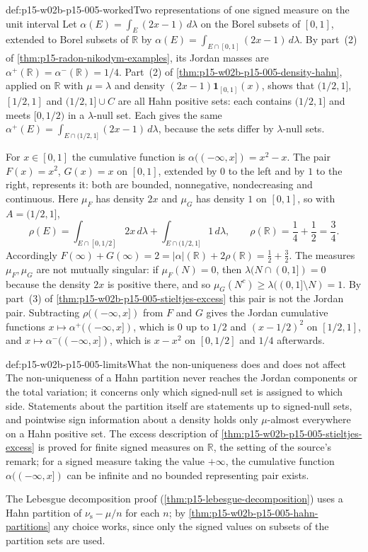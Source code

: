 \begin{hbexample}{def:p15-w02b-p15-005-worked}{Two representations of one signed measure on the unit interval}
Let \(\alpha(E)=\int_E(2x-1)\,d\lambda\) on the Borel subsets of
\([0,1]\), extended to Borel subsets of \(\mathbb R\) by
\(\alpha(E)=\int_{E\cap[0,1]}(2x-1)\,d\lambda\). By
part~(2) of \cref{thm:p15-radon-nikodym-examples}, its Jordan masses
are \(\alpha^+(\mathbb R)=\alpha^-(\mathbb R)=1/4\). Part~(2) of
\cref{thm:p15-w02b-p15-005-density-hahn}, applied on \(\mathbb R\) with
\(\mu=\lambda\) and density \((2x-1)\mathbf1_{[0,1]}(x)\), shows that
\((1/2,1]\), \([1/2,1]\) and \((1/2,1]\cup C\) are all Hahn positive
sets: each contains \((1/2,1]\) and meets \([0,1/2)\) in a
\(\lambda\)-null set. Each gives the same
\(\alpha^+(E)=\int_{E\cap(1/2,1]}(2x-1)\,d\lambda\), because the sets
differ by \(\lambda\)-null sets.

For \(x\in[0,1]\) the cumulative function is
\(\alpha((-\infty,x])=x^2-x\). The pair \(F(x)=x^2\), \(G(x)=x\) on
\([0,1]\), extended by \(0\) to the left and by \(1\) to the right,
represents it: both are bounded, nonnegative, nondecreasing and
continuous. Here \(\mu_F\) has density \(2x\) and \(\mu_G\) has density
\(1\) on \([0,1]\), so with \(A=(1/2,1]\),
\[
 \rho(E)=\int_{E\cap[0,1/2]}2x\,d\lambda+\int_{E\cap(1/2,1]}1\,d\lambda,
 \qquad \rho(\mathbb R)=\frac14+\frac12=\frac34 .
\]
Accordingly \(F(\infty)+G(\infty)=2=\lvert\alpha\rvert(\mathbb R)+2\rho(\mathbb R)
=\tfrac12+\tfrac32\). The measures \(\mu_F,\mu_G\) are not mutually
singular: if \(\mu_F(N)=0\), then \(\lambda(N\cap(0,1])=0\) because the
density \(2x\) is positive there, and so
\(\mu_G(N^c)\geq\lambda((0,1]\setminus N)=1\). By part~(3) of \cref{thm:p15-w02b-p15-005-stieltjes-excess}
this pair is not the Jordan pair. Subtracting
\(\rho((-\infty,x])\) from \(F\) and \(G\) gives the Jordan cumulative
functions \(x\mapsto\alpha^+((-\infty,x])\), which is \(0\) up to
\(1/2\) and \((x-1/2)^2\) on \([1/2,1]\), and
\(x\mapsto\alpha^-((-\infty,x])\), which is \(x-x^2\) on \([0,1/2]\) and
\(1/4\) afterwards.
\end{hbexample}

\begin{hbwarning}{def:p15-w02b-p15-005-limits}{What the non-uniqueness does and does not affect}
The non-uniqueness of a Hahn partition never reaches the Jordan
components or the total variation; it concerns only which signed-null
set is assigned to which side. Statements about the partition itself
are statements up to signed-null sets, and pointwise sign information
about a density holds only \(\mu\)-almost everywhere on a Hahn positive
set. The excess description of
\cref{thm:p15-w02b-p15-005-stieltjes-excess} is proved for finite signed
measures on \(\mathbb R\), the setting of the source's remark; for a
signed measure taking the value \(+\infty\), the cumulative function
\(\alpha((-\infty,x])\) can be infinite and no bounded representing
pair exists.
\end{hbwarning}

The Lebesgue decomposition proof (\cref{thm:p15-lebesgue-decomposition})
uses a Hahn partition of \(\nu_{\mathrm s}-\mu/n\) for each \(n\); by
\cref{thm:p15-w02b-p15-005-hahn-partitions} any choice works, since only
the signed values on subsets of the partition sets are used.

